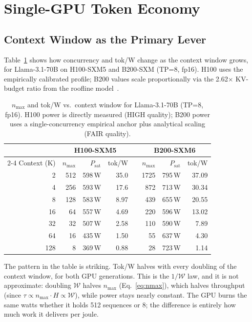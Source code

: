 \documentclass[11pt,a4paper]{article}
\newcommand{\nmax}{n_{\max}}
\begin{document}
\section{Single-GPU Token Economy}
\label{sec:single-gpu}

\subsection{Context Window as the Primary Lever}
\label{sec:ctx-lever}

Table~\ref{tab:ctx-nmax} shows how concurrency and tok/W change as the context
window grows, for Llama-3.1-70B on H100-SXM5 and B200-SXM (TP=8, fp16).
H100 uses the empirically calibrated profile; B200 values scale proportionally
via the 2.62$\times$ KV-budget ratio from the roofline
model~\citep{xu2026aiconfigurator,chen2026fleetsim}.

\begin{table}[htbp]
\centering
\caption{$\nmax$ and tok/W vs.\ context window for Llama-3.1-70B (TP=8, fp16).
  H100 power is directly measured (HIGH quality); B200 power uses a
  single-concurrency empirical anchor plus analytical scaling (FAIR quality).}
\label{tab:ctx-nmax}
\small
\begin{tabular}{rrrrrrrr}
\toprule
& \multicolumn{3}{c}{H100-SXM5} & \phantom{ab} & \multicolumn{3}{c}{B200-SXM6} \\
\cmidrule{2-4} \cmidrule{6-8}
Context (K) & $\nmax$ & $P_{\text{sat}}$ & tok/W &
            & $\nmax$ & $P_{\text{sat}}$ & tok/W \\
\midrule
 2  &   512 & 598\,W & 35.0 && 1725 & 795\,W &  37.09 \\
 4  &   256 & 593\,W & 17.6 &&  872 & 713\,W &  30.34 \\
 8  &   128 & 583\,W &  8.97 &&  439 & 655\,W &  20.55 \\
16  &    64 & 557\,W &  4.69 &&  220 & 596\,W &  13.02 \\
32  &    32 & 507\,W &  2.58 &&  110 & 590\,W &   7.89 \\
64  &    16 & 435\,W &  1.50 &&   55 & 637\,W &   4.30 \\
128 &     8 & 369\,W &  0.88 &&   28 & 723\,W &   1.14 \\
\bottomrule
\end{tabular}
\end{table}

The pattern in the table is striking.  Tok/W halves with every doubling of the
context window, for both GPU generations.  This is the $1/\mathcal{W}$ law, and
it is not approximate: doubling $\mathcal{W}$ halves $\nmax$
(Eq.~\eqref{eq:nmax}), which halves throughput (since $\tau \propto \nmax
\cdot H \propto \mathcal{W}$), while power stays nearly constant.  The GPU
burns the same watts whether it holds 512 sequences or 8; the difference is
entirely how much work it delivers per joule.
\end{document}
